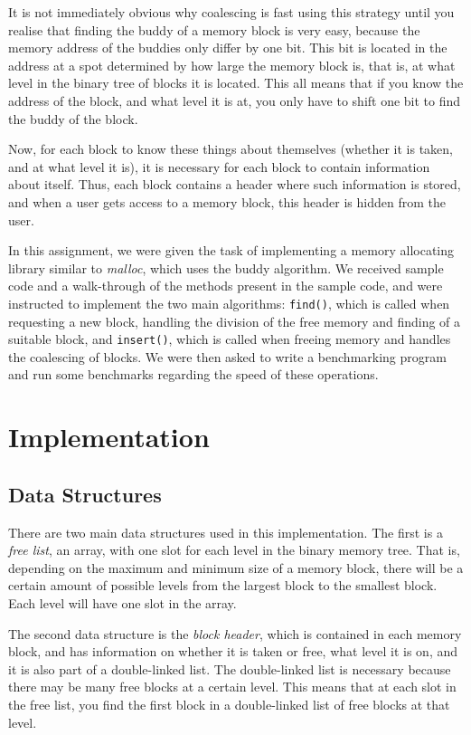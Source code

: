 \documentclass{article}
\def\code#1{\texttt{#1}}
\begin{document}
It is not immediately obvious why coalescing is fast using this strategy until you realise that finding the buddy of a memory block is very easy, because the memory address of the buddies only differ by one bit. This bit is located in the address at a spot determined by how large the memory block is, that is, at what level in the binary tree of blocks it is located. This all means that if you know the address of the block, and what level it is at, you only have to shift one bit to find the buddy of the block.

Now, for each block to know these things about themselves (whether it is taken, and at what level it is), it is necessary for each block to contain information about itself. Thus, each block contains a header where such information is stored, and when a user gets access to a memory block, this header is hidden from the user.

In this assignment, we were given the task of implementing a memory allocating library similar to \textit{malloc}, which uses the buddy algorithm. We received sample code and a walk-through of the methods present in the sample code, and were instructed to implement the two main algorithms: \code{find()}, which is called when requesting a new block, handling the division of the free memory and finding of a suitable block, and \code{insert()}, which is called when freeing memory and handles the coalescing of blocks. We were then asked to write a benchmarking program and run some benchmarks regarding the speed of these operations.

\section{Implementation}

\subsection{Data Structures}

There are two main data structures used in this implementation. The first is a \textit{free list}, an array, with one slot for each level in the binary memory tree. That is, depending on the maximum and minimum size of a memory block, there will be a certain amount of possible levels from the largest block to the smallest block. Each level will have one slot in the array.

The second data structure is the \textit{block header}, which is contained in each memory block, and has information on whether it is taken or free, what level it is on, and it is also part of a double-linked list. The double-linked list is necessary because there may be many free blocks at a certain level. This means that at each slot in the free list, you find the first block in a double-linked list of free blocks at that level.
\end{document}

